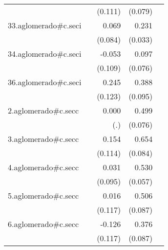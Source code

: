 {\begin{longtable}{l*{4}{D{.}{.}{-1}}}
            &                     &     (0.111)         &     (0.079)         &                     \\
\addlinespace
33.aglomerado#c.seci&                     &       0.069         &       0.231\sym{***}&                     \\
            &                     &     (0.084)         &     (0.033)         &                     \\
\addlinespace
34.aglomerado#c.seci&                     &      -0.053         &       0.097         &                     \\
            &                     &     (0.109)         &     (0.076)         &                     \\
\addlinespace
36.aglomerado#c.seci&                     &       0.245\sym{*}  &       0.388\sym{***}&                     \\
            &                     &     (0.123)         &     (0.095)         &                     \\
\addlinespace
2.aglomerado#c.secc&                     &       0.000         &       0.499\sym{***}&                     \\
            &                     &         (.)         &     (0.076)         &                     \\
\addlinespace
3.aglomerado#c.secc&                     &       0.154         &       0.654\sym{***}&                     \\
            &                     &     (0.114)         &     (0.084)         &                     \\
\addlinespace
4.aglomerado#c.secc&                     &       0.031         &       0.530\sym{***}&                     \\
            &                     &     (0.095)         &     (0.057)         &                     \\
\addlinespace
5.aglomerado#c.secc&                     &       0.016         &       0.506\sym{***}&                     \\
            &                     &     (0.117)         &     (0.087)         &                     \\
\addlinespace
6.aglomerado#c.secc&                     &      -0.126         &       0.376\sym{***}&                     \\
            &                     &     (0.117)         &     (0.087)         &                     \\

\end{longtable}}
